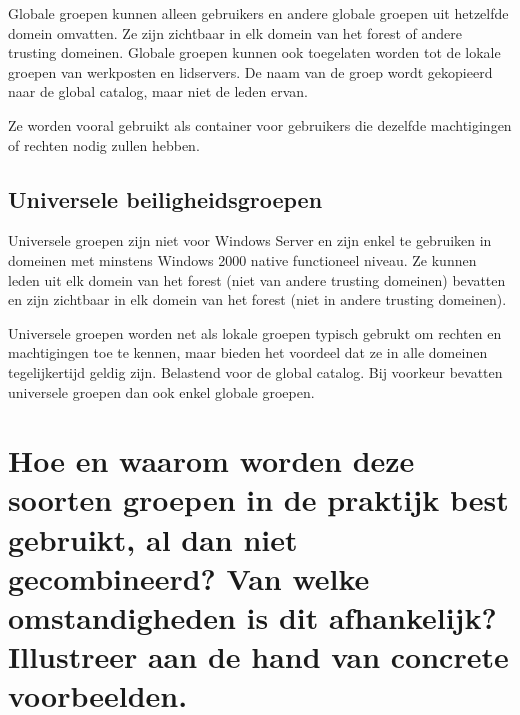 Globale groepen kunnen alleen gebruikers en andere globale groepen uit hetzelfde
domein omvatten. Ze zijn zichtbaar in elk domein van het forest of andere
trusting domeinen. Globale groepen kunnen ook toegelaten worden tot de lokale
groepen van werkposten en lidservers. De naam van de groep wordt gekopieerd naar
de global catalog, maar niet de leden ervan.

Ze worden vooral gebruikt als container voor gebruikers die dezelfde
machtigingen of rechten nodig zullen hebben.

\subsection{Universele beiligheidsgroepen}

Universele groepen zijn niet voor Windows Server en zijn enkel te gebruiken in
domeinen met minstens Windows 2000 native functioneel niveau. Ze kunnen leden
uit elk domein van het forest (niet van andere trusting domeinen) bevatten en
zijn zichtbaar in elk domein van het forest (niet in andere trusting domeinen).

Universele groepen worden net als lokale groepen typisch gebrukt om rechten en
machtigingen toe te kennen, maar bieden het voordeel dat ze in alle domeinen
tegelijkertijd geldig zijn. Belastend voor de global catalog. Bij voorkeur
bevatten universele groepen dan ook enkel globale groepen.

\section{Hoe en waarom worden deze soorten groepen in de praktijk best gebruikt,
al dan niet gecombineerd? Van welke omstandigheden is dit afhankelijk?
Illustreer aan de hand van concrete voorbeelden.}

